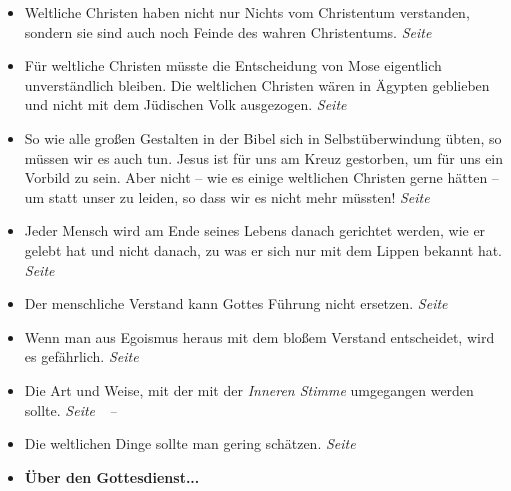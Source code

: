 \begin{itemize}
 \item Weltliche Christen haben nicht nur Nichts vom Christentum verstanden,
sondern sie sind auch noch Feinde des wahren Christentums.
 \dotfill \textit{Seite~\pageref{ref:04_13_weltliche_christen}}\\

 \item Für weltliche Christen müsste die Entscheidung von Mose eigentlich
unverständlich bleiben. Die weltlichen Christen wären in Ägypten geblieben und
nicht mit dem Jüdischen Volk ausgezogen.
 \dotfill \textit{Seite~\pageref{ref:04_17_mose}}\\

 \item So wie alle großen Gestalten in der Bibel sich in Selbstüberwindung
übten, so müssen wir es auch tun. Jesus ist für uns am Kreuz gestorben, um für uns
ein Vorbild zu sein. Aber nicht -- wie es einige weltlichen Christen gerne
hätten -- um statt unser zu leiden, so dass wir es nicht mehr müssten!
 \dotfill \textit{Seite~\pageref{ref:04_20_opfertod}}\\

 \item Jeder Mensch wird am Ende seines Lebens danach gerichtet werden, wie er
gelebt hat und nicht danach, zu was er sich nur mit dem Lippen bekannt hat.
 \dotfill \textit{Seite~\pageref{ref:04_21_gericht}}\\

 \item Der menschliche Verstand kann Gottes Führung nicht ersetzen.
 \dotfill \textit{Seite~\pageref{ref:04_22_vernunft}}\\

 \item Wenn man aus Egoismus heraus mit dem bloßem Verstand entscheidet, wird
es gefährlich.
 \dotfill \textit{Seite~\pageref{ref:04_22_vernunft_und_ego}}\\

 \item Die Art und Weise, mit der mit der \textit{Inneren Stimme} umgegangen werden
sollte.
 \dotfill
 \textit{Seite~\pageref{ref:04_23_innere_stimme}~--~\pageref{ref:04_23_innere_stimme_ende}}\\

 \item Die weltlichen Dinge sollte man gering schätzen.
 \dotfill \textit{Seite~\pageref{ref:04_23_dinge_der_welt}}\\

 \item \textbf{Über den Gottesdienst...}


\end{itemize}
